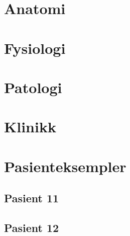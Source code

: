 \documentclass[a4paper,12pt,twoside]{memoir}
\begin{document}
		\section{Anatomi}
		\section{Fysiologi}
		\section{Patologi}
		\section{Klinikk}
		\section{Pasienteksempler}
			\subsection{Pasient 11}
			\subsection{Pasient 12}

 

 \renewcommand{\bibname}{Kilder:}
            {}
			
\end{document}
